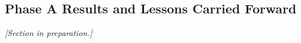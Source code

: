 \subsection{Phase A Results and Lessons Carried Forward}
\label{sec:phaseA_results}

\emph{[Section in preparation.]}
